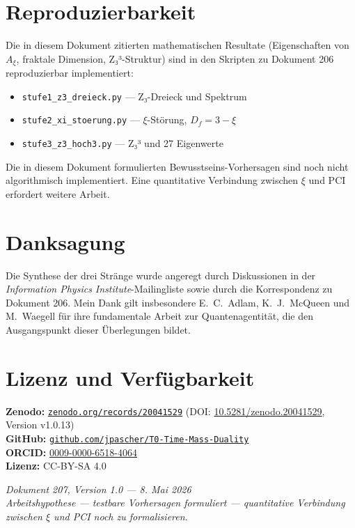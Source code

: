 \documentclass[11pt,a4paper]{article}
\begin{document}
	\section*{Reproduzierbarkeit}
	
	Die in diesem Dokument zitierten mathematischen Resultate (Eigenschaften von \(A_\xi\), fraktale Dimension, Z₃³-Struktur) sind in den Skripten zu Dokument 206 reproduzierbar implementiert:
	
	\begin{itemize}
		\item \texttt{stufe1\_z3\_dreieck.py} — Z₃-Dreieck und Spektrum
		\item \texttt{stufe2\_xi\_stoerung.py} — \(\xi\)-Störung, \(D_f = 3 - \xi\)
		\item \texttt{stufe3\_z3\_hoch3.py} — Z₃³ und 27 Eigenwerte
	\end{itemize}
	
	Die in diesem Dokument formulierten Bewusstseins-Vorhersagen sind noch nicht algorithmisch implementiert. Eine quantitative Verbindung zwischen \(\xi\) und PCI erfordert weitere Arbeit.
	
	\section*{Danksagung}
	
	Die Synthese der drei Stränge wurde angeregt durch Diskussionen in der \emph{Information Physics Institute}-Mailingliste sowie durch die Korrespondenz zu Dokument 206. Mein Dank gilt insbesondere E.~C.~Adlam, K.~J.~McQueen und M.~Waegell für ihre fundamentale Arbeit zur Quantenagentität, die den Ausgangspunkt dieser Überlegungen bildet.
	
	\section*{Lizenz und Verfügbarkeit}
	
	\textbf{Zenodo:} \href{https://zenodo.org/records/20041529}{\texttt{zenodo.org/records/20041529}} (DOI: \href{https://doi.org/10.5281/zenodo.20041529}{10.5281/zenodo.20041529}, Version v1.0.13)\\
	\textbf{GitHub:} \href{https://github.com/jpascher/T0-Time-Mass-Duality}{\texttt{github.com/jpascher/T0-Time-Mass-Duality}}\\
	\textbf{ORCID:} \href{https://orcid.org/0009-0000-6518-4064}{0009-0000-6518-4064}\\
	\textbf{Lizenz:} CC-BY-SA 4.0
	
	\vspace{1cm}
	\noindent
	\textit{Dokument 207, Version 1.0 — 8. Mai 2026} \\
	\textit{Arbeitshypothese — testbare Vorhersagen formuliert — quantitative Verbindung zwischen \(\xi\) und PCI noch zu formalisieren.}
	
\end{document}
